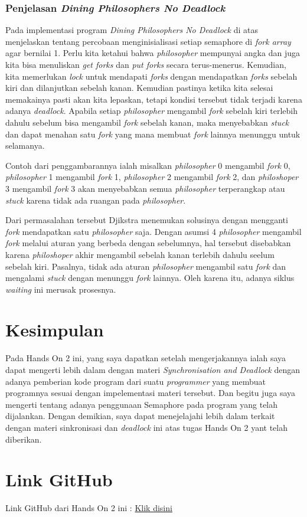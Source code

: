 \documentclass[11pt,a4paper]{article}
\begin{document}
\subsubsection{Penjelasan \textit{Dining Philosophers No Deadlock}}
Pada implementasi program \textit{Dining Philosophers No Deadlock} di atas menjelaskan tentang percobaan menginisialisasi setiap semaphore di \textit{fork array} agar bernilai 1.
Perlu kita ketahui bahwa \textit{philosopher} mempunyai angka dan juga kita bisa menuliskan \textit{get forks} dan \textit{put forks} secara terus-menerus. Kemudian, kita memerlukan 
\textit{lock} untuk mendapati \textit{forks} dengan mendapatkan \textit{forks} sebelah kiri dan dilanjutkan sebelah kanan. Kemudian pastinya ketika kita selesai memakainya pasti akan kita 
lepaskan, tetapi kondisi tersebut tidak terjadi karena adanya \textit{deadlock}. Apabila setiap \textit{philosopher} mengambil \textit{fork} sebelah kiri terlebih dahulu sebelum bisa mengambil 
\textit{fork} sebelah kanan, maka menyebabkan \textit{stuck} dan dapat menahan satu \textit{fork} yang mana membuat \textit{fork} lainnya menunggu untuk selamanya. \par
Contoh dari penggambarannya ialah misalkan \textit{philosopher} 0 mengambil \textit{fork} 0, \textit{philosopher} 1 mengambil \textit{fork} 1, \textit{philosopher} 2 mengambil \textit{fork} 2, dan 
\textit{philoshoper} 3 mengambil \textit{fork} 3 akan menyebabkan semua \textit{philosopher} terperangkap atau \textit{stuck} karena tidak ada ruangan pada \textit{philosopher}. \par
Dari permasalahan tersebut Djikstra menemukan solusinya dengan mengganti \textit{fork} mendapatkan satu \textit{philosopher} saja. Dengan asumsi 4 \textit{philosopher} mengambil \textit{fork} melalui 
aturan yang berbeda dengan sebelumnya, hal tersebut disebabkan karena \textit{philoshoper} akhir mengambil sebelah kanan terlebih dahulu seelum sebelah kiri. Pasalnya, tidak ada aturan \textit{philosopher} 
mengambil satu \textit{fork} dan mengalami \textit{stuck} dengan menunggu \textit{fork} lainnya. Oleh karena itu, adanya siklus \textit{waiting} ini merusak prosesnya.

\newpage
\section{Kesimpulan}
	Pada Hands On 2 ini, yang saya dapatkan setelah mengerjakannya ialah saya dapat mengerti lebih dalam dengan materi 
	\textit{Synchronisation and Deadlock} dengan adanya pemberian kode program dari suatu \textit{programmer} yang membuat 
	programnya sesuai dengan impelementasi materi tersebut. Dan begitu juga saya mengerti tentang adanya penggunaan Semaphore 
	pada program yang telah dijalankan. Dengan demikian, saya dapat menejelajahi lebih dalam terkait dengan materi sinkronisasi 
	dan \textit{deadlock} ini atas tugas Hands On 2 yant telah diberikan.
		
\section{Link GitHub}
	Link GitHub dari Hands On 2 ini : \href{https://github.com/BilhaqAD07/Sistem-Operasi.git}{Klik disini}


\newpage


\end{document}

